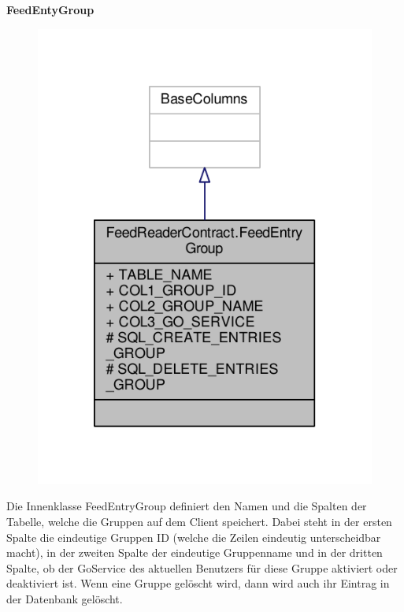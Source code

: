 \textbf{FeedEntyGroup}
\begin{figure}[H]
	\includegraphics[scale = 1]{res/umlClasses/feed_reader_contract_group.pdf}
	\centering
\end{figure}
Die Innenklasse FeedEntryGroup definiert den Namen und die Spalten der Tabelle, welche die Gruppen auf dem Client speichert. 
Dabei steht in der ersten Spalte die eindeutige Gruppen ID (welche die Zeilen eindeutig unterscheidbar macht), in der zweiten Spalte der eindeutige Gruppenname und in der dritten Spalte, ob der GoService des aktuellen Benutzers für diese Gruppe aktiviert oder deaktiviert ist.
Wenn eine Gruppe gelöscht wird, dann wird auch ihr Eintrag in der Datenbank gelöscht.

